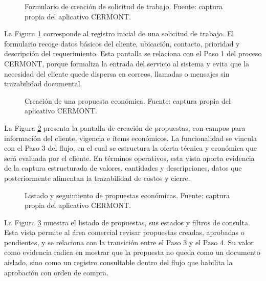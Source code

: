 \begin{figure}[H]
\centering
{}
\caption{Formulario de creación de solicitud de trabajo. Fuente: captura propia del aplicativo CERMONT.}
\label{fig:captura-nueva-solicitud}
\end{figure}

La Figura \ref{fig:captura-nueva-solicitud} corresponde al registro inicial de una solicitud de trabajo. El formulario recoge datos básicos del cliente, ubicación, contacto, prioridad y descripción del requerimiento. Esta pantalla se relaciona con el Paso 1 del proceso CERMONT, porque formaliza la entrada del servicio al sistema y evita que la necesidad del cliente quede dispersa en correos, llamadas o mensajes sin trazabilidad documental.

\begin{figure}[H]
\centering
{}
\caption{Creación de una propuesta económica. Fuente: captura propia del aplicativo CERMONT.}
\label{fig:captura-nueva-propuesta}
\end{figure}

La Figura \ref{fig:captura-nueva-propuesta} presenta la pantalla de creación de propuestas, con campos para información del cliente, vigencia e ítems económicos. La funcionalidad se vincula con el Paso 3 del flujo, en el cual se estructura la oferta técnica y económica que será evaluada por el cliente. En términos operativos, esta vista aporta evidencia de la captura estructurada de valores, cantidades y descripciones, datos que posteriormente alimentan la trazabilidad de costos y cierre.

\begin{figure}[H]
\centering
{}
\caption{Listado y seguimiento de propuestas económicas. Fuente: captura propia del aplicativo CERMONT.}
\label{fig:captura-listado-propuestas}
\end{figure}

La Figura \ref{fig:captura-listado-propuestas} muestra el listado de propuestas, sus estados y filtros de consulta. Esta vista permite al área comercial revisar propuestas creadas, aprobadas o pendientes, y se relaciona con la transición entre el Paso 3 y el Paso 4. Su valor como evidencia radica en mostrar que la propuesta no queda como un documento aislado, sino como un registro consultable dentro del flujo que habilita la aprobación con orden de compra.

